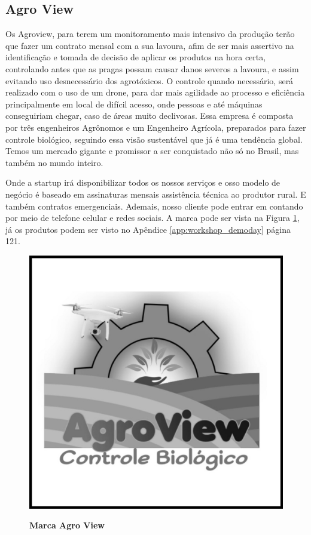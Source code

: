 \subsection{Agro View}


Os Agroview, para terem um monitoramento mais intensivo da  produção terão que fazer um contrato mensal com a 
sua lavoura, afim de ser mais assertivo na identificação e tomada de decisão de aplicar os produtos  na hora certa, controlando antes que as pragas possam causar danos severos a lavoura, e assim  evitando uso desnecessário dos agrotóxicos. O controle quando necessário, será realizado com o uso de um drone, para dar mais agilidade ao processo e eficiência principalmente em local de difícil acesso, onde pessoas e até máquinas conseguiriam chegar, caso  de áreas muito declivosas. Essa empresa é composta por três engenheiros Agrônomos e um Engenheiro Agrícola, preparados para fazer controle biológico, seguindo  essa  visão sustentável que  já é uma tendência global. Temos um mercado gigante e promissor a ser  conquistado não só no Brasil, mas também no mundo inteiro.

Onde a startup irá disponibilizar todos os nossos serviços e  osso modelo de negócio é baseado em assinaturas mensais assistência técnica ao produtor rural. E também contratos emergenciais. Ademais, nosso cliente pode entrar em contando por meio de telefone celular e redes sociais. A marca pode ser vista na Figura \ref{figura_19}, já os produtos podem ser visto no Apêndice \ref{app:workshop_demoday} página 121.


\begin{figure}[!htb]
\centering
\caption{\textbf{Marca Agro View}}
\includegraphics[scale=0.13]{Imagens/agroview.jpg}
\label{figura_19}
\end{figure}


